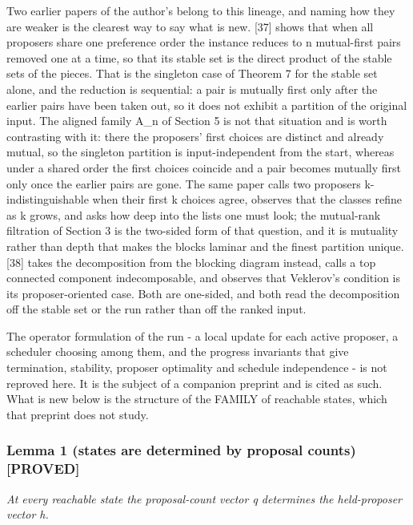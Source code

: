 \documentclass[
  11pt,
]{article}
\begin{document}
Two earlier papers of the author's belong to this lineage, and naming
how they are weaker is the clearest way to say what is new. {[}37{]}
shows that when all proposers share one preference order the instance
reduces to n mutual-first pairs removed one at a time, so that its
stable set is the direct product of the stable sets of the pieces. That
is the singleton case of Theorem 7 for the stable set alone, and the
reduction is sequential: a pair is mutually first only after the earlier
pairs have been taken out, so it does not exhibit a partition of the
original input. The aligned family A\_n of Section 5 is not that
situation and is worth contrasting with it: there the proposers' first
choices are distinct and already mutual, so the singleton partition is
input-independent from the start, whereas under a shared order the first
choices coincide and a pair becomes mutually first only once the earlier
pairs are gone. The same paper calls two proposers k-indistinguishable
when their first k choices agree, observes that the classes refine as k
grows, and asks how deep into the lists one must look; the mutual-rank
filtration of Section 3 is the two-sided form of that question, and it
is mutuality rather than depth that makes the blocks laminar and the
finest partition unique. {[}38{]} takes the decomposition from the
blocking diagram instead, calls a top connected component
indecomposable, and observes that Veklerov's condition is its
proposer-oriented case. Both are one-sided, and both read the
decomposition off the stable set or the run rather than off the ranked
input.

The operator formulation of the run - a local update for each active
proposer, a scheduler choosing among them, and the progress invariants
that give termination, stability, proposer optimality and schedule
independence - is not reproved here. It is the subject of a companion
preprint and is cited as such. What is new below is the structure of the
FAMILY of reachable states, which that preprint does not study.

\hypertarget{lemma-1-states-are-determined-by-proposal-counts-proved}{%
\subsubsection{Lemma 1 (states are determined by proposal counts)
{[}PROVED{]}}\label{lemma-1-states-are-determined-by-proposal-counts-proved}}

\emph{At every reachable state the proposal-count vector q determines
the held-proposer vector h.}
\end{document}
